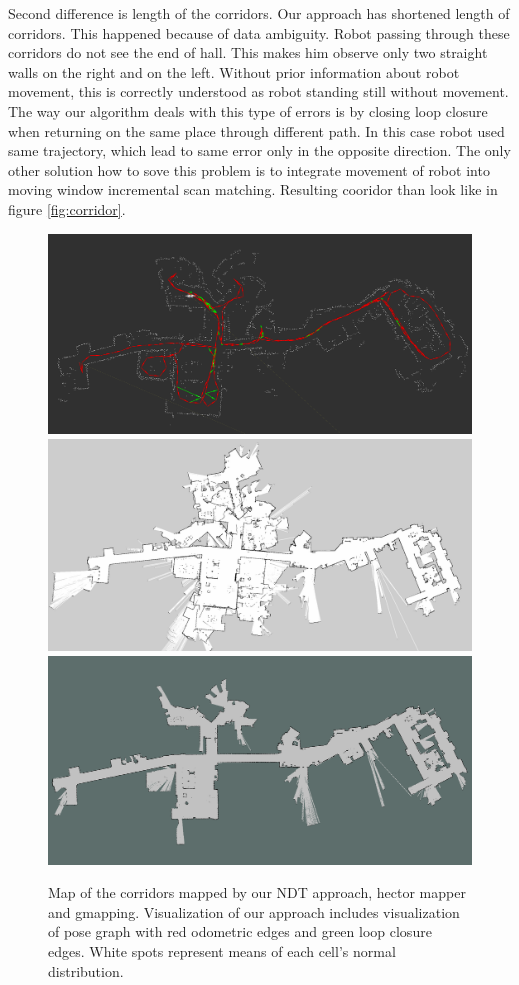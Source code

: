 Second difference is length of the corridors. Our approach has shortened length of corridors. This happened because of data ambiguity. Robot passing through these corridors do not see the end of hall. This makes him observe only two straight walls on the right and on the left. Without prior information about robot movement, this is correctly understood as robot standing still without movement. The way our algorithm deals with this type of errors is by closing loop closure when returning on the same place through different path. In this case robot used same trajectory, which lead to same error only in the opposite direction. The only other solution how to sove this problem is to integrate movement of robot into moving window incremental scan matching. Resulting cooridor than look like in figure \ref{fig:corridor}. 
\begin{figure}
	\centering
	\includegraphics[width=140mm]{../img/full_ndt.png}
	\includegraphics[width=140mm]{../img/full_hector.png}
	\includegraphics[width=140mm]{../img/full_gmapping.png}
	
	\caption{Map of the corridors mapped by our \gls{NDT} approach, hector mapper and gmapping. Visualization of our approach includes visualization of pose graph with red odometric edges and green loop closure edges. White spots represent means of each cell's  normal distribution.}\label{fig:full_res}
\end{figure}

